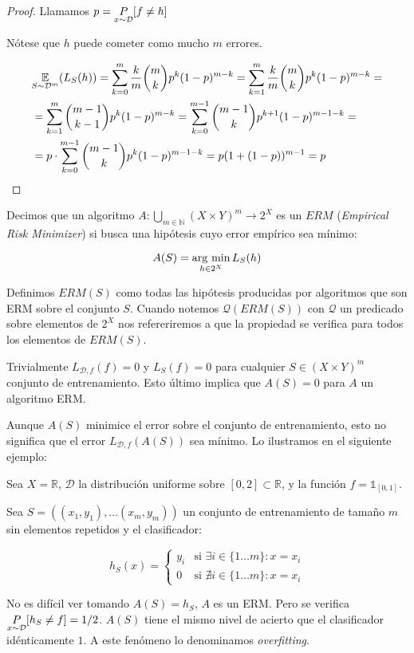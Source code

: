 \begin{proof}
  Llamamos $p= \underset{x\sim \mathcal{D}}{P} [f\neq h]$

  Nótese que $h$ puede cometer como mucho $m$ errores.
  
  \begin{align*}
  & \underset{S\sim \mathcal{D}^m}{\mathbb{E}}(L_S(h)) = \sum_{k=0}^m \frac{k}{m} \binom{m}{k} p^k(1-p)^{m-k} = \sum_{k=1}^m \frac{k}{m} \binom{m}{k} p^k(1-p)^{m-k} =\\
  & = \sum_{k=1}^m \binom{m-1}{k-1} p^k(1-p)^{m-k} = \sum_{k=0}^{m-1} \binom{m-1}{k} p^{k+1}(1-p)^{m-1-k} = \\
  & = p\cdot \sum_{k=0}^{m-1} \binom{m-1}{k} p^{k}(1-p)^{m-1-k} = p(1+(1-p))^{m-1} = p
  \end{align*}
\end{proof}


\begin{definition}
Decimos que un algoritmo $A: \underset{m\in \mathbb{N}}{\bigcup} (X\times Y)^m \rightarrow 2^{X}$ es un $ERM$ 
(\textit{Empirical Risk Minimizer}) si busca una hipótesis cuyo error empírico sea mínimo:

\[A(S) = \operatorname*{arg\,\min}_{h\in 2^X} L_S(h)\]
\end{definition}

Definimos $ERM(S)$ como todas las hipótesis producidas por algoritmos que son ERM
sobre el conjunto $S$. Cuando notemos $\mathcal{Q}(ERM(S))$ con $\mathcal{Q}$ un predicado sobre elementos 
de $2^X$ nos refereriremos a que la propiedad se verifica para todos los elementos de $ERM(S)$.

Trivialmente $L_{\mathcal{D},f}(f) = 0$ y $L_S(f) = 0$ para cualquier $S \in (X \times Y)^m$ conjunto de entrenamiento.
Esto último implica que $A(S) = 0$ para $A$ un algoritmo ERM.

Aunque $A(S)$ minimice el error sobre el conjunto de entrenamiento, esto no significa que el error $L_{\mathcal{D},f} (A(S))$ 
sea mínimo. Lo ilustramos en el siguiente ejemplo:

\begin{example}
Sea $X = \mathbb{R}$, $\mathcal{D}$ la distribución uniforme sobre $[0,2]\subset \mathbb{R}$, y la función
$f= \mathds{1}_{[0,1]}$.


Sea $S = ((x_1,y_1), \ldots (x_m, y_m))$ un conjunto de entrenamiento de tamaño $m$ sin elementos repetidos 
y el clasificador:

\[h_S(x) = \left\{\begin{array}{ll}
y_i & \textrm{si } \exists i\in \{1\ldots m\} : x=x_i\\
0   & \textrm{si } \nexists i\in \{1\ldots m\} : x=x_i
\end{array}\right.\]

No es difícil ver tomando $A(S) = h_S$, $A$ es un ERM. Pero se verifica $\underset{x\sim \mathcal{D}}{P}[h_S \neq f] = 1/2$. $A(S)$ tiene el 
mismo nivel de acierto que el clasificador idénticamente $1$. A este fenómeno lo denominamos \textit{overfitting}.
\end{example}

